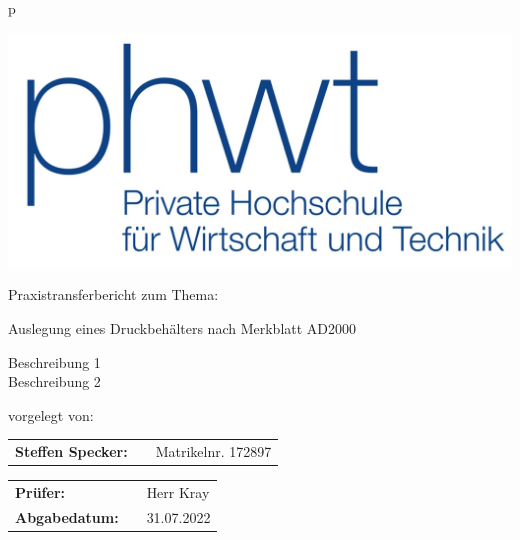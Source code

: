 \thispagestyle{empty}
\begin{tabular}{p{\textwidth}}

\vspace{0.5cm}

\begin{center}
\includegraphics[scale=1]{img/PHWT-Logo.jpg}\\
\end{center}

\vspace{0.5cm}

\begin{center}
\large{Praxistransferbericht zum Thema:\\}
\end{center}

\begin{center}
\Large{Auslegung eines Druckbehälters nach Merkblatt AD2000}
\end{center}

\vspace{1cm}

\begin{center}
Beschreibung 1\\
Beschreibung 2\\
\end{center} 


\begin{center}
vorgelegt von: 
\end{center}

\begin{center}
    \begin{tabular}{lll}
        \textbf{Steffen Specker:} & & Matrikelnr. 172897
        \end{tabular} 
\end{center}

\vspace{0.5cm}

\begin{center}
\begin{tabular}{lll}
\textbf{Prüfer:} & & Herr Kray\\
\textbf{Abgabedatum:} & & 31.07.2022\\
\end{tabular}
\end{center}

\end{tabular}